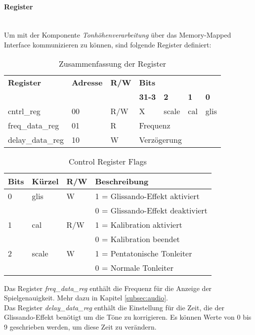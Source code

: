 \paragraph{Register}\mbox{}\\
Um mit der Komponente \textit{Tonhöhenverarbeitung} über das Memory-Mapped Interface kommunizieren zu können, sind folgende Register definiert:

\begin{table}[H]
	\centering
	\caption{Zusammenfassung der Register}
	\label{tab:Registers_pitch}
	\begin{tabular}{l|l|l|l|l|l|l}
		\textbf{Register} & \textbf{Adresse} & \textbf{R/W} &	\multicolumn{4}{l}{\textbf{Bits}} \\\cline{4-7}
						  &					 &				& \textbf{31-3}  & \textbf{2} & \textbf{1} & \textbf{0}\\ 
		\hline \hline
		
		cntrl\_reg & 00 & R/W & X & scale & cal & glis \\ 
		\hline
		freq\_data\_reg & 01 & R & \multicolumn{4}{l}{Frequenz} \\
		\hline
		delay\_data\_reg & 10 & W & \multicolumn{4}{l}{Verzögerung} \\
	\end{tabular}
\end{table}

\begin{table}[H]
	\centering
	\caption{Control Register Flags}
	\label{tab:Register_pitch_cntrl}
	\begin{tabular}{l|l|l|l}
		\textbf{Bits} & \textbf{Kürzel} & \textbf{R/W} &	\textbf{Beschreibung}\\
		\hline \hline
		
		0 & glis & W &  1 = Glissando-Effekt aktiviert \\ 
		  &      &   &  0 = Glissando-Effekt deaktiviert \\ 
		\hline
		1 & cal & R/W &  1 = Kalibration aktiviert \\ 
		  &     &     &  0 = Kalibration beendet \\ 
		\hline
		2 & scale & W &  1 = Pentatonische Tonleiter \\ 
		 &     &       &  0 = Normale Tonleiter \\ 
		\hline

	\end{tabular}
\end{table}

Das Register \textit{freq\_data\_reg} enthält die Frequenz für die Anzeige der Spielgenauigkeit. Mehr dazu in Kapitel \ref{subsec:audio}. \\
Das Register \textit{delay\_data\_reg} enthält die Einstellung für die Zeit, die der Glissando-Effekt benötigt um die Töne zu korrigieren. Es können Werte von 0 bis 9 geschrieben werden, um diese Zeit zu verändern.

